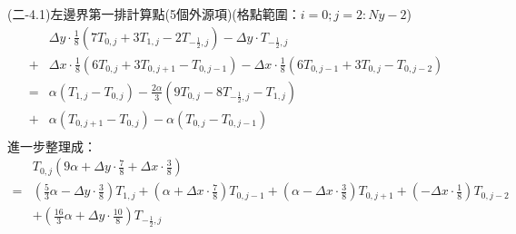 \documentclass[12pt]{article}
\begin{document}
\noindent (二-4.1)左邊界第一排計算點(5個外源項)(格點範圍：$i = 0 ; j = 2:Ny-2$)\\
\begin{equation}
\begin{split}
  &\Delta y \cdot \frac{1}{8}\left(7T_{0,j}+3T_{1,j}-2T_{-\frac{1}{2},j}\right)  
  - \Delta y \cdot T_{-\frac{1}{2},j}\\
  + &\Delta x \cdot \frac{1}{8}\left(6T_{0,j}+3T_{0,j+1}-T_{0,j-1}\right)  
  - \Delta x \cdot \frac{1}{8}\left(6T_{0,j-1}+3T_{0,j}-T_{0,j-2}\right) \\
  = & \alpha (T_{1,j}-T_{0,j})-  \frac{2\alpha}{3} (9T_{0,j}-8T_{-\frac{1}{2},j}-T_{1,j})\\
  + & \alpha (T_{0,j+1}-T_{0,j}) -  \alpha ( T_{0,j}-T_{0,j-1}) \\
\end{split}
\end{equation}
\noindent 進一步整理成：
\begin{equation}
\begin{split}
    &T_{0,j}(9\alpha+\Delta y \cdot \frac{7}{8}+\Delta x \cdot \frac{3}{8})\\
  = &(\frac{5}{3}\alpha-\Delta y \cdot \frac{3}{8})T_{1,j}+(\alpha+\Delta x \cdot \frac{7}{8})T_{0,j-1}
    +(\alpha-\Delta x \cdot \frac{3}{8})T_{0,j+1}+(-\Delta x \cdot \frac{1}{8})T_{0,j-2}\\
    &+(\frac{16}{3}\alpha+\Delta y \cdot \frac{10}{8})T_{-\frac{1}{2},j}
\end{split}
\end{equation}
\end{document}
